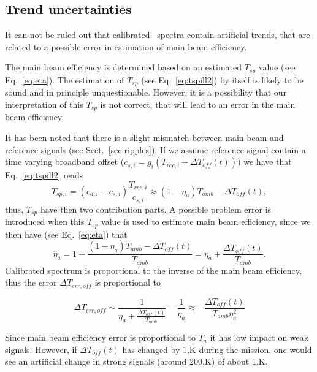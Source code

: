 \subsection{Trend uncertainties}
\label{sec:trends}
It can not be ruled out that calibrated \smr\ spectra
contain artificial trends, that are related to a
possible error in estimation of main beam efficiency.

The main beam efficiency is determined based on an estimated
\(T_{sp}\) value (see Eq.~\ref{eq:eta}).
The estimation of \(T_{sp}\) (see Eq.~\ref{eq:tspill2}) by itself
is likely to be sound and in principle unquestionable.
However, it is a possibility that our interpretation 
of this \(T_{sp}\) is not correct, that will lead to an error
in the main beam efficiency.

It has been noted that there is a slight mismatch between
main beam and reference signals (see Sect.~\ref{sec:ripples}).
If we assume reference signal contain a time varying
broadband offset (\(c_{s,i}=g_{i}(T_{rec,i}+\Delta T_{off}(t))\)) 
we have that Eq.~\ref{eq:tspill2} reads
\begin{equation}
 T_{sp,i}=(c_{a,i}-c_{s,i})\frac{T_{rec,i}}{c_{s,i}}\approx(1-\eta_{a})T_{amb}-\Delta T_{off}(t),
\end{equation}
thus, \(T_{sp}\) have then two contribution parts. 
A possible problem error is introduced when this \(T_{sp}\) value
is used to estimate main beam efficiency, since we then have (see Eq.~\ref{eq:eta})
that  
\begin{equation}
\hat{\eta}_{a}=1-\frac{(1-\eta_{a})T_{amb}-\Delta T_{off}(t)}{T_{amb}} = \eta_{a} + \frac{\Delta T_{off}(t)}{T_{amb}}. 
\end{equation}
Calibrated spectrum is proportional to the inverse of the main beam efficiency,
thus the error \(\Delta T_{err,off}\)  is proportional to

\begin{equation}
 \Delta T_{err,off} \sim \frac{1}{\eta_{a}+\frac{\Delta T_{off}(t)}{T_{amb}}}-\frac{1}{\eta_{a}}\approx
 -\frac{\Delta T_{off}(t)}{T_{amb}\eta_{a}^{2}}
\end{equation}

Since main beam efficiency error is proportional to \(T_{a}\) it has low impact
on weak signals. However, if \(\Delta T_{off}(t)\) has changed by 1,K
during the mission, one would see an artificial change in strong 
signals (around 200,K) of about 1,K. 






